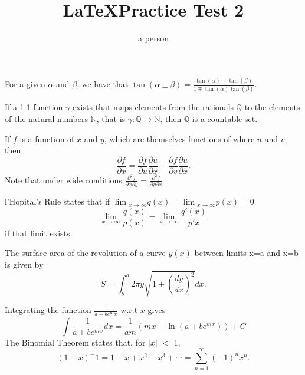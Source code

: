 \documentclass[12pt,a4paper]{article}
\begin{document}
\title{\LaTeX Practice Test 2}
\author{a person}
\maketitle

\par For a given $\alpha$ and $\beta$, we have that $\displaystyle \tan(\alpha \pm \beta) = \frac{\tan(\alpha) \pm\tan(\beta)}{1 \mp \tan(\alpha)\tan(\beta)}$.

\par 	If a 1:1 function $\gamma$ exists that maps elements from the rationals $\mathbb{Q}$ to the elements of the natural numbers $\mathbb{N}$, that is $\gamma : \mathbb{Q} \rightarrow \mathbb{N}$, then $\mathbb{Q}$ is a countable set.

\par If $f$ is a function of $x$ and $y$, which are themselves functions of where $u$ and $v$, then
\begin{equation} 
  \frac{\partial f}{\partial x}=\frac{\partial f}{\partial u}\frac{\partial u}     {\partial x} + \frac{\partial f}{\partial v}\frac{\partial u}{\partial x}.
\end{equation}
Note that under wide conditions $\displaystyle \frac{\partial ^2 f}{\partial x\partial  y}=\frac{\partial ^2 f}{\partial y\partial x}$ 

\par l'Hopital's Rule states that if $\displaystyle \lim{_{x \rightarrow \infty}} q(x)= \lim{_{x \rightarrow \infty}} p(x)=0$
\begin{equation} \lim_{x \rightarrow \infty} \frac{q(x)}{p(x)}=\lim_{x \rightarrow \infty} \frac{q'(x)}{p'{x}}
\end{equation}
if that limit exists.
\par{ \parskip=0mm \parindent=6mm The surface area of the revolution of a curve $y(x)$ between limits x=a and x=b is given by}
\begin{equation*}
S= \int^a _b 2\pi y \sqrt{1+ (\frac{dy}{dx})^2} dx.
\end{equation*}
\par Integrating the function $\displaystyle \frac{1}{a+be^mx}$ w.r.t $x$ gives 
\begin{equation} \int \frac{1}{a+be^{mx}}dx=\frac{1}{am}(mx- \ln(a+be^{mx}))+ C
\end{equation}
The Binomial Theorem states that, for $|x|$ $<$ 1,
\begin{equation} (1-x)^-1=1-x+x^2-x^3+ \cdots = \sum^\infty_{n=1}(-1)^nx^n.
\end{equation}
\end{document}
